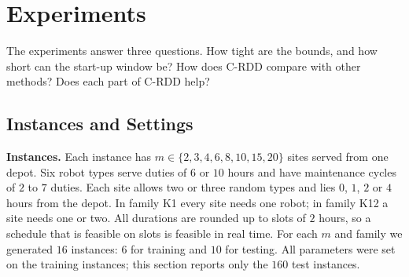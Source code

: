 \section{Experiments}
\label{sec:experiments}


The experiments answer three questions.
How tight are the bounds, and how short can the start-up window be?
How does C-RDD compare with other methods?
Does each part of C-RDD help?

\subsection{Instances and Settings}
\label{sec:exp:setup}

\textbf{Instances.}
Each instance has $m \in \{2, 3, 4, 6, 8, 10, 15, 20\}$ sites served from one depot.
Six robot types serve duties of $6$ or $10$ hours and have maintenance cycles of $2$ to $7$ duties.
Each site allows two or three random types and lies $0$, $1$, $2$ or $4$ hours from the depot.
In family K1 every site needs one robot; in family K12 a site needs one or two.
All durations are rounded up to slots of $2$ hours, so a schedule that is feasible on slots is feasible in real time.
For each $m$ and family we generated $16$ instances: $6$ for training and $10$ for testing.
All parameters were set on the training instances; this section reports only the $160$ test instances.

